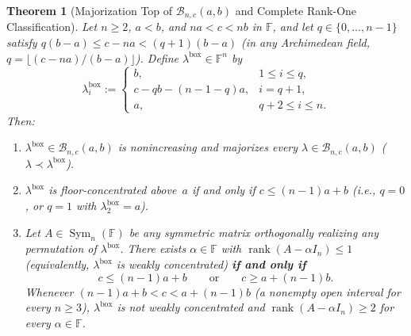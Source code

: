 \documentclass[11pt]{article}
\newtheorem{theorem}{Theorem}[section]
\theoremstyle{definition}
\theoremstyle{remark}
\newcommand{\rk}{\operatorname{rank}}
\newcommand{\Sym}{\operatorname{Sym}}
\begin{document}
\begin{theorem}[Majorization Top of $\mathcal{B}_{n,c}(a,b)$ and Complete Rank-One Classification]
\label{thm:box-classification}
Let $n \ge 2$, $a < b$, and $n a < c < n b$ in $\mathbb{F}$, and let $q \in \{0, \dots, n-1\}$ satisfy $q(b - a) \le c - n a < (q + 1)(b - a)$ (in any Archimedean field, $q = \lfloor (c - n a)/(b - a) \rfloor$). Define $\lambda^{\mathrm{box}} \in \mathbb{F}^n$ by
\[
  \lambda_i^{\mathrm{box}} :=
  \begin{cases}
    b, & 1 \le i \le q,\\
    c - q b - (n - 1 - q)a, & i = q + 1,\\
    a, & q + 2 \le i \le n.
  \end{cases}
\]
Then:
\begin{enumerate}
  \item $\lambda^{\mathrm{box}} \in \mathcal{B}_{n,c}(a,b)$ is nonincreasing and majorizes every $\lambda \in \mathcal{B}_{n,c}(a,b)$ ($\lambda \prec \lambda^{\mathrm{box}}$).
  \item $\lambda^{\mathrm{box}}$ is floor-concentrated above~$a$ if and only if $c \le (n-1)a + b$ (i.e., $q = 0$, or $q = 1$ with $\lambda_2^{\mathrm{box}} = a$).
  \item Let $A \in \Sym_n(\mathbb{F})$ be \emph{any} symmetric matrix orthogonally realizing any permutation of $\lambda^{\mathrm{box}}$. There exists $\alpha \in \mathbb{F}$ with $\rk(A - \alpha I_n) \le 1$ (equivalently, $\lambda^{\mathrm{box}}$ is weakly concentrated) \textbf{if and only if}
  \[
    c \le (n - 1)a + b \qquad\text{or}\qquad c \ge a + (n - 1)b.
  \]
  Whenever $(n - 1)a + b < c < a + (n - 1)b$ (a nonempty open interval for every $n \ge 3$), $\lambda^{\mathrm{box}}$ is not weakly concentrated and $\rk(A - \alpha I_n) \ge 2$ for every $\alpha \in \mathbb{F}$.
\end{enumerate}
\end{theorem}
\end{document}
